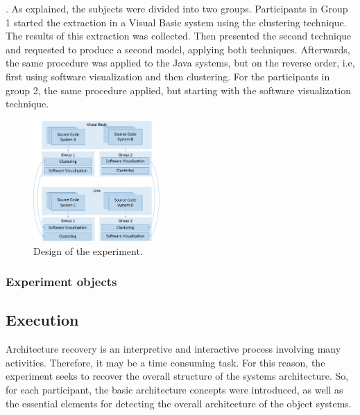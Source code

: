 \documentclass{sig-alternate-05-2015}
\begin{document}


. As explained, the subjects were divided into two groups. 
Participants in Group 1 started the extraction in a Visual Basic system 
using the clustering technique. The results of this extraction was collected. Then 
 presented the second technique and requested to produce a second model, 
applying both techniques. Afterwards, the same procedure was applied to the Java systems, 
but on the reverse order, i.e, first using software visualization and then clustering. 
For the participants in group 2, the same procedure applied, but starting with the 
software visualization technique.

\begin{figure}[!h]
	\centering
	\includegraphics[width=0.43\textwidth]{design_experimento}
	\caption{Design of the experiment.}
	\label{design_experimento}
\end{figure}

\subsubsection{Experiment objects}%


\subsection{Execution}%
Architecture recovery is an interpretive and interactive process involving many activities. Therefore, it may be a time consuming task. For this reason, the experiment seeks to recover the overall structure of the systems architecture. So, for each participant, the basic architecture concepts were introduced, as well as the essential elements for detecting the overall architecture of the object systems. 
\end{document}
